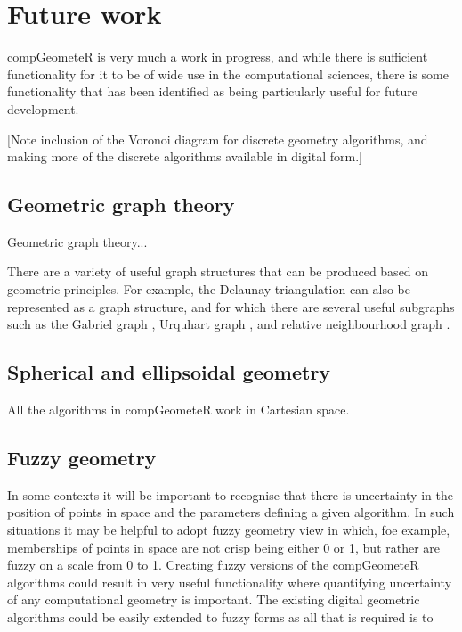 \documentclass[12pt, a4paper]{article}
\begin{document}
\section{Future work}

compGeometeR is very much a work in progress, and while there is sufficient functionality for it to be of wide use in the computational sciences, there is some functionality that has been identified as being particularly useful for future development.

[Note inclusion of the Voronoi diagram for discrete geometry algorithms, and making more of the discrete algorithms available in digital form.]

\subsection{Geometric graph theory}

Geometric graph theory...

There are a variety of useful graph structures that can be produced based on geometric principles.  For example, the Delaunay triangulation \citep{delaunay-1934} can also be represented as a graph structure, and for which there are several useful subgraphs such as the Gabriel graph \citep{gabriel-1969}, Urquhart graph \citep{urquhart-1980}, and relative neighbourhood graph \citep{toussaint-1980}.



\subsection{Spherical and ellipsoidal geometry}

All the algorithms in compGeometeR work in Cartesian space.

\subsection{Fuzzy geometry}

In some contexts it will be important to recognise that there is uncertainty in the position of points in space and the parameters defining a given algorithm.  In such situations it may be helpful to adopt fuzzy geometry \citep{rosenfeld-1998} view in which, foe example, memberships of points in space are not crisp being either 0 or 1, but rather are fuzzy on a scale from 0 to 1.  Creating fuzzy versions of the compGeometeR algorithms could result in very useful functionality where quantifying uncertainty of any computational geometry is important.  The existing digital geometric algorithms could be easily extended to fuzzy forms as all that is required is to 
\end{document}
